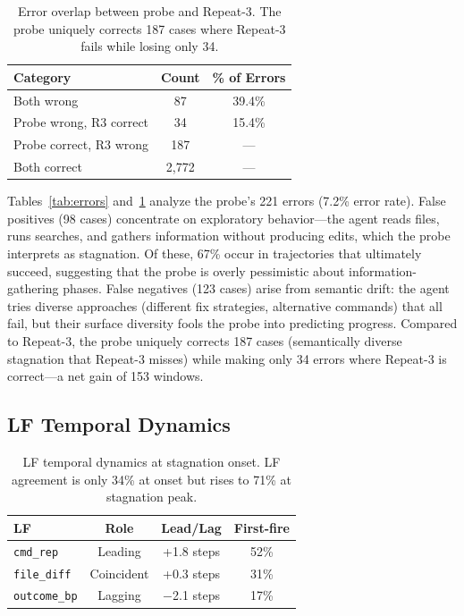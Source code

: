 \documentclass[11pt,a4paper]{article}
\begin{document}
\begin{table}[t]
\centering
\small
\begin{tabular}{lcc}
\toprule
\textbf{Category} & \textbf{Count} & \textbf{\% of Errors} \\
\midrule
Both wrong & 87 & 39.4\% \\
Probe wrong, R3 correct & 34 & 15.4\% \\
Probe correct, R3 wrong & 187 & --- \\
Both correct & 2,772 & --- \\
\bottomrule
\end{tabular}
\caption{Error overlap between probe and Repeat-3. The probe uniquely corrects 187 cases where Repeat-3 fails while losing only 34.}
\label{tab:error-overlap}
\end{table}

Tables~\ref{tab:errors} and~\ref{tab:error-overlap} analyze the probe's 221 errors (7.2\% error rate).
False positives (98 cases) concentrate on exploratory behavior---the agent reads files, runs searches, and gathers information without producing edits, which the probe interprets as stagnation.
Of these, 67\% occur in trajectories that ultimately succeed, suggesting that the probe is overly pessimistic about information-gathering phases.
False negatives (123 cases) arise from semantic drift: the agent tries diverse approaches (different fix strategies, alternative commands) that all fail, but their surface diversity fools the probe into predicting progress.
Compared to Repeat-3, the probe uniquely corrects 187 cases (semantically diverse stagnation that Repeat-3 misses) while making only 34 errors where Repeat-3 is correct---a net gain of 153 windows.

\subsection{LF Temporal Dynamics}

\begin{table}[t]
\centering
\small
\begin{tabular}{lccc}
\toprule
\textbf{LF} & \textbf{Role} & \textbf{Lead/Lag} & \textbf{First-fire} \\
\midrule
\texttt{cmd\_rep} & Leading & +1.8 steps & 52\% \\
\texttt{file\_diff} & Coincident & +0.3 steps & 31\% \\
\texttt{outcome\_bp} & Lagging & $-$2.1 steps & 17\% \\
\bottomrule
\end{tabular}
\caption{LF temporal dynamics at stagnation onset. LF agreement is only 34\% at onset but rises to 71\% at stagnation peak.}
\label{tab:lf-dynamics}
\end{table}
\end{document}
